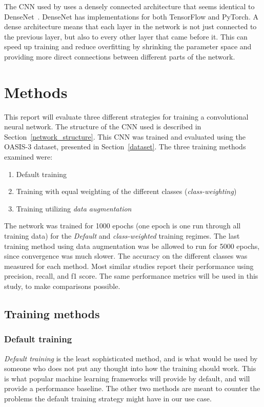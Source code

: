 \documentclass{kththesis}
\newcommand{\num}[1]{{#1}}
\begin{document}
The CNN used by \textcite{islam2018early} uses a densely connected architecture that seems identical to DenseNet~\cite{huang2017densely}. DenseNet has implementations for both TensorFlow and PyTorch. A dense architecture means that each layer in the network is not just connected to the previous layer, but also to every other layer that came before it. This can speed up training and reduce overfitting by shrinking the parameter space and providing more direct connections between different parts of the network.

\chapter{Methods}
This report will evaluate three different strategies for training a convolutional neural network. The structure of the CNN used is described in Section~\ref{network_structure}. This CNN was trained and evaluated using the OASIS-3 dataset, presented in Section~\ref{dataset}. The three training methods examined were:
\begin{enumerate}
  \item Default training
  \item Training with equal weighting of the different classes (\textit{class-weighting})
  \item Training utilizing \textit{data augmentation}
\end{enumerate}

The network was trained for \num{1000} epochs (one epoch is one run through all training data) for the \textit{Default} and \textit{class-weighted} training regimes. The last training method using data augmentation was be allowed to run for \num{5000} epochs, since convergence was much slower. The accuracy on the different classes was measured for each method. Most similar studies report their performance using precision, recall, and f1 score. The same performance metrics will be used in this study, to make comparisons possible.

\section{Training methods}
\subsection{Default training}
\textit{Default training} is the least sophisticated method, and is what would be used by someone who does not put any thought into how the training should work. This is what popular machine learning frameworks will provide by default, and will provide a performance baseline. The other two methods are meant to counter the problems the default training strategy might have in our use case.
\end{document}
